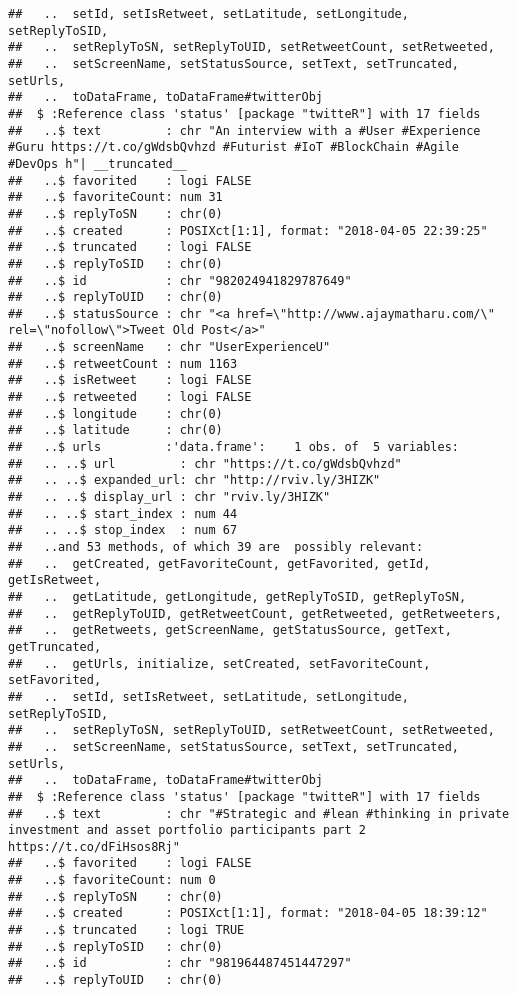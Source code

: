\documentclass[]{article}
\begin{document}
\begin{verbatim}
##   ..  setId, setIsRetweet, setLatitude, setLongitude, setReplyToSID,
##   ..  setReplyToSN, setReplyToUID, setRetweetCount, setRetweeted,
##   ..  setScreenName, setStatusSource, setText, setTruncated, setUrls,
##   ..  toDataFrame, toDataFrame#twitterObj
##  $ :Reference class 'status' [package "twitteR"] with 17 fields
##   ..$ text         : chr "An interview with a #User #Experience #Guru https://t.co/gWdsbQvhzd #Futurist #IoT #BlockChain #Agile #DevOps h"| __truncated__
##   ..$ favorited    : logi FALSE
##   ..$ favoriteCount: num 31
##   ..$ replyToSN    : chr(0) 
##   ..$ created      : POSIXct[1:1], format: "2018-04-05 22:39:25"
##   ..$ truncated    : logi FALSE
##   ..$ replyToSID   : chr(0) 
##   ..$ id           : chr "982024941829787649"
##   ..$ replyToUID   : chr(0) 
##   ..$ statusSource : chr "<a href=\"http://www.ajaymatharu.com/\" rel=\"nofollow\">Tweet Old Post</a>"
##   ..$ screenName   : chr "UserExperienceU"
##   ..$ retweetCount : num 1163
##   ..$ isRetweet    : logi FALSE
##   ..$ retweeted    : logi FALSE
##   ..$ longitude    : chr(0) 
##   ..$ latitude     : chr(0) 
##   ..$ urls         :'data.frame':    1 obs. of  5 variables:
##   .. ..$ url         : chr "https://t.co/gWdsbQvhzd"
##   .. ..$ expanded_url: chr "http://rviv.ly/3HIZK"
##   .. ..$ display_url : chr "rviv.ly/3HIZK"
##   .. ..$ start_index : num 44
##   .. ..$ stop_index  : num 67
##   ..and 53 methods, of which 39 are  possibly relevant:
##   ..  getCreated, getFavoriteCount, getFavorited, getId, getIsRetweet,
##   ..  getLatitude, getLongitude, getReplyToSID, getReplyToSN,
##   ..  getReplyToUID, getRetweetCount, getRetweeted, getRetweeters,
##   ..  getRetweets, getScreenName, getStatusSource, getText, getTruncated,
##   ..  getUrls, initialize, setCreated, setFavoriteCount, setFavorited,
##   ..  setId, setIsRetweet, setLatitude, setLongitude, setReplyToSID,
##   ..  setReplyToSN, setReplyToUID, setRetweetCount, setRetweeted,
##   ..  setScreenName, setStatusSource, setText, setTruncated, setUrls,
##   ..  toDataFrame, toDataFrame#twitterObj
##  $ :Reference class 'status' [package "twitteR"] with 17 fields
##   ..$ text         : chr "#Strategic and #lean #thinking in private investment and asset portfolio participants part 2 https://t.co/dFiHsos8Rj"
##   ..$ favorited    : logi FALSE
##   ..$ favoriteCount: num 0
##   ..$ replyToSN    : chr(0) 
##   ..$ created      : POSIXct[1:1], format: "2018-04-05 18:39:12"
##   ..$ truncated    : logi TRUE
##   ..$ replyToSID   : chr(0) 
##   ..$ id           : chr "981964487451447297"
##   ..$ replyToUID   : chr(0) 

\end{verbatim}
\end{document}
